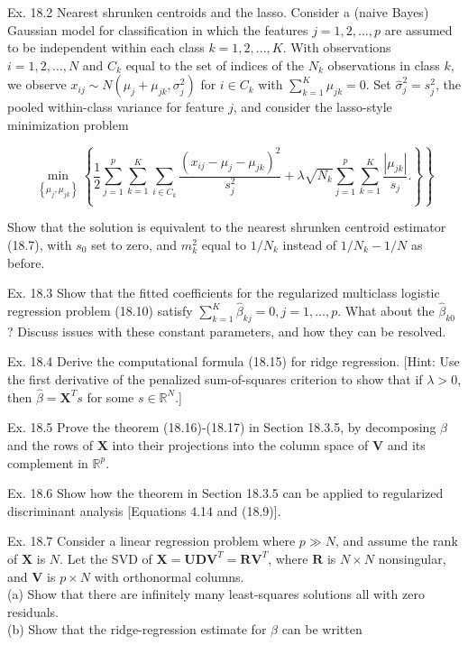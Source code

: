 \documentclass[10pt]{article}
\begin{document}
Ex. 18.2 Nearest shrunken centroids and the lasso. Consider a (naive Bayes) Gaussian model for classification in which the features $j=1,2, \ldots, p$ are assumed to be independent within each class $k=1,2, \ldots, K$. With observations $i=1,2, \ldots, N$ and $C_{k}$ equal to the set of indices of the $N_{k}$ observations in class $k$, we observe $x_{i j} \sim N\left(\mu_{j}+\mu_{j k}, \sigma_{j}^{2}\right)$ for $i \in C_{k}$ with $\sum_{k=1}^{K} \mu_{j k}=0$. Set $\hat{\sigma}_{j}^{2}=s_{j}^{2}$, the pooled within-class variance for feature $j$, and consider the lasso-style minimization problem


\begin{equation*}
\left.\min _{\left\{\mu_{j}, \mu_{j k}\right\}}\left\{\frac{1}{2} \sum_{j=1}^{p} \sum_{k=1}^{K} \sum_{i \in C_{k}} \frac{\left(x_{i j}-\mu_{j}-\mu_{j k}\right)^{2}}{s_{j}^{2}}+\lambda \sqrt{N_{k}} \sum_{j=1}^{p} \sum_{k=1}^{K} \frac{\left|\mu_{j k}\right|}{s_{j}} .\right\}\right\} \tag{18.55)}
\end{equation*}


Show that the solution is equivalent to the nearest shrunken centroid estimator (18.7), with $s_{0}$ set to zero, and $m_{k}^{2}$ equal to $1 / N_{k}$ instead of $1 / N_{k}-1 / N$ as before.

Ex. 18.3 Show that the fitted coefficients for the regularized multiclass logistic regression problem (18.10) satisfy $\sum_{k=1}^{K} \hat{\beta}_{k j}=0, j=1, \ldots, p$. What about the $\hat{\beta}_{k 0}$ ? Discuss issues with these constant parameters, and how they can be resolved.

Ex. 18.4 Derive the computational formula (18.15) for ridge regression. [Hint: Use the first derivative of the penalized sum-of-squares criterion to show that if $\lambda>0$, then $\hat{\beta}=\mathbf{X}^{T} s$ for some $s \in \mathbb{R}^{N}$.]

Ex. 18.5 Prove the theorem (18.16)-(18.17) in Section 18.3.5, by decomposing $\beta$ and the rows of $\mathbf{X}$ into their projections into the column space of $\mathbf{V}$ and its complement in $\mathbb{R}^{p}$.

Ex. 18.6 Show how the theorem in Section 18.3.5 can be applied to regularized discriminant analysis [Equations 4.14 and (18.9)].

Ex. 18.7 Consider a linear regression problem where $p \gg N$, and assume the rank of $\mathbf{X}$ is $N$. Let the SVD of $\mathbf{X}=\mathbf{U D V}^{T}=\mathbf{R V}^{T}$, where $\mathbf{R}$ is $N \times N$ nonsingular, and $\mathbf{V}$ is $p \times N$ with orthonormal columns.\\
(a) Show that there are infinitely many least-squares solutions all with zero residuals.\\
(b) Show that the ridge-regression estimate for $\beta$ can be written
\end{document}

